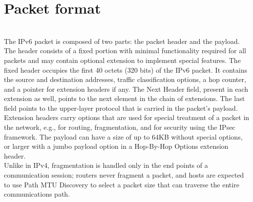 \documentclass[12pt]{article}
\begin{document}
\section{Packet format}\\
The IPv6 packet is composed of two parts: the packet header and the payload. The header consists of a fixed portion with minimal functionality required for all packets and may contain optional extension to implement special features.
The fixed header occupies the first 40 octets (320 bits) of the IPv6 packet. It contains the source and destination addresses, traffic classification options, a hop counter, and a pointer for extension headers if any. The Next Header field, present in each extension as well, points to the next element in the chain of extensions. The last field points to the upper-layer protocol that is carried in the packet's payload.\\
Extension headers carry options that are used for special treatment of a packet in the network, e.g., for routing, fragmentation, and for security using the IPsec framework.
The payload can have a size of up to 64KB without special options, or larger with a jumbo payload option in a Hop-By-Hop Options extension header.\\
Unlike in IPv4, fragmentation is handled only in the end points of a communication session; routers never fragment a packet, and hosts are expected to use Path MTU Discovery to select a packet size that can traverse the entire communications path.\\
\end{document}
